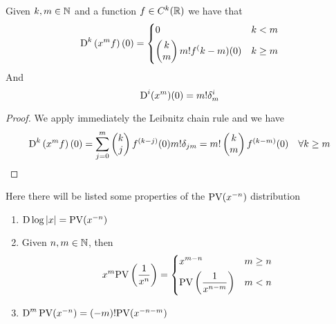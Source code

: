 \documentclass[../complete.tex]{subfiles}
\begin{document}
\begin{thm}
	Given $k,m\in\N$ and a function $f\in C^k(\R)$ we have that
	\begin{equation*}
		\D^k\left( x^mf \right)(0)=\begin{dcases}
			0&k<m\\
			\begin{pmatrix}
				k\\m
			\end{pmatrix}m!f^(k-m)(0)&k\ge m
		\end{dcases}
	\end{equation*}
	And
	\begin{equation*}
		\D^i(x^m)(0)=m!\delta_m^i
	\end{equation*}
\end{thm}
\begin{proof}
	We apply immediately the Leibnitz chain rule and we have
	\begin{equation*}
		\D^k\left( x^mf \right)(0)=\sum_{j=0}^m\begin{pmatrix}
			k\\j
		\end{pmatrix}f^{(k-j)}(0)m!\delta_{jm}=m!\begin{pmatrix}
			k\\m
		\end{pmatrix}f^{(k-m)}(0)\quad\forall k\ge m
	\end{equation*}
\end{proof}
\begin{thm}
	Here there will be listed some properties of the $\cpvdistl$ distribution
	\begin{enumerate}
	\item $\D\log\abs{x}=\cpvdistl$
	\item Given $n,m\in\N$, then
		\begin{equation*}
			x^m\cpvdist=\begin{dcases}
				x^{m-n}&m\ge n\\
				\cpvdist[n-m]&m<n
			\end{dcases}
		\end{equation*}
	\item  $\D^m\cpvdistl=(-m)!\cpvdistl[n-m]$
	\end{enumerate}
\end{thm}
\end{document}
